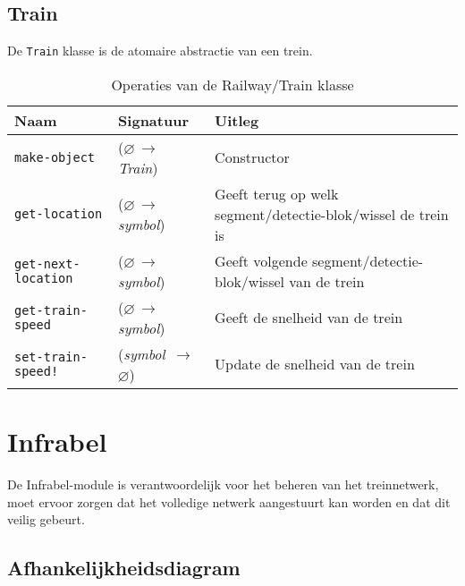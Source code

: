 \documentclass[a4paper, 11pt]{article}
\newcommand{\naar}{\,$\rightarrow$\,}
\renewcommand{\empty}{$\varnothing$}
\newcommand{\<}{\scriptsize\textless\normalsize}
\renewcommand{\>}{\scriptsize\textgreater\normalsize}
\begin{document}
\subsection{Train} %
De \texttt{Train} klasse is de atomaire abstractie van een trein.
\begin{table}[H]
	\begin{center}
		{
		\begin{tabular}{|l l l|}
			\hline
			\textbf{Naam} & \textbf{Signatuur} & \textbf{Uitleg}\\
			\hline
			\texttt{make-object} & (\empty \naar \textit{Train}) & Constructor\\
			\hline
			\texttt{get-location} & (\empty \naar \textit{symbol}) & Geeft terug op welk segment/detectie-blok/wissel de trein is\\
			\texttt{get-next-location} & (\empty \naar \textit{symbol}) & Geeft volgende segment/detectie-blok/wissel van de trein\\
			\texttt{get-train-speed} & (\empty \naar \textit{symbol}) & Geeft de snelheid van de trein\\
			\texttt{set-train-speed!} & (\textit{symbol} \naar \empty) & Update de snelheid van de trein\\
			\hline
		\end{tabular}}
		\caption{Operaties van de Railway/Train klasse}
	\end{center}
\end{table}

\newpage

\section{Infrabel} %
De Infrabel-module is verantwoordelijk voor het beheren van het treinnetwerk, moet ervoor zorgen dat het volledige netwerk aangestuurt kan worden en dat dit veilig gebeurt.

\subsection{Afhankelijkheidsdiagram} %
\begin{center}
\end{center}
\end{document}
